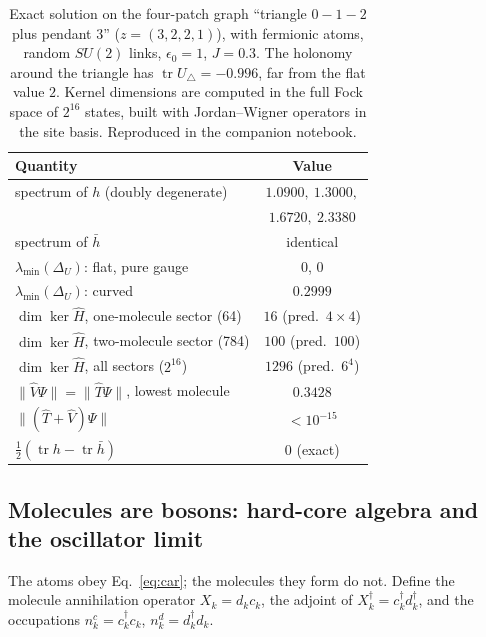 \documentclass[reprint,aps,prd,amsmath,amssymb,superscriptaddress,nofootinbib,floatfix]{revtex4-2}
\theoremstyle{plain}
\theoremstyle{definition}
\theoremstyle{remark}
\newcommand{\Mol}{\ensuremath{X}}                 %
\newcommand{\tr}{\operatorname{tr}}
\newcommand{\Hc}{\hat{H}}
\newcommand{\Tc}{\hat{T}}
\newcommand{\Vc}{\hat{V}}
\newcommand{\SU}{SU(2)}
\begin{document}
\begin{table}[t]
\caption{\label{tab:balance}Exact solution on the four-patch graph ``triangle $0\!-\!1\!-\!2$ plus pendant
$3$'' ($z=(3,2,2,1)$), with fermionic atoms, random $\SU$ links, $\epsilon_0=1$, $J=0.3$. The holonomy around the triangle has
$\tr U_\triangle=-0.996$, far from the flat value $2$. Kernel dimensions are computed in the full Fock space of $2^{16}$
states, built with Jordan--Wigner operators in the site basis. Reproduced in the companion notebook.}
\begin{ruledtabular}
\begin{tabular}{lc}
Quantity & Value \\
\hline
spectrum of $h$ (doubly degenerate) & $1.0900,\ 1.3000,$\\
 & $1.6720,\ 2.3380$\\
spectrum of $\bar h$ & identical\\
$\lambda_{\min}(\Delta_U)$: flat, pure gauge & $0$, $0$\\
$\lambda_{\min}(\Delta_U)$: curved & $0.2999$\\
$\dim\ker\Hc$, one-molecule sector (64) & $16$ (pred.\ $4\times4$)\\
$\dim\ker\Hc$, two-molecule sector (784) & $100$ (pred.\ $100$)\\
$\dim\ker\Hc$, all sectors ($2^{16}$) & $1296$ (pred.\ $6^4$)\\
$\|\Vc\Psi\|=\|\Tc\Psi\|$, lowest molecule & $0.3428$\\
$\|(\Tc+\Vc)\Psi\|$ & $<10^{-15}$\\
$\tfrac12(\tr h-\tr\bar h)$ & $0$ (exact)
\end{tabular}
\end{ruledtabular}
\end{table}

\subsection{Molecules are bosons: hard-core algebra and the oscillator limit}
\label{sec:molecules}

The atoms obey Eq.~\eqref{eq:car}; the molecules they form do not. Define the molecule annihilation operator
$\Mol_k=d_kc_k$, the adjoint of $\Mol^\dagger_k=c^\dagger_kd^\dagger_k$, and the occupations $n^c_k=c^\dagger_kc_k$, $n^d_k=d^\dagger_kd_k$.
\end{document}
